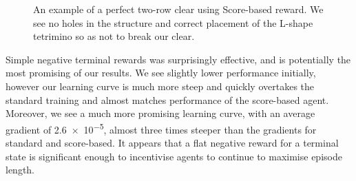 \documentclass[12pt]{article}
\begin{document}
\begin{figure}[H]
    \centering
    
    
    \caption{An example of a perfect two-row clear using Score-based reward. We see no holes in the structure and correct placement of the L-shape tetrimino so as not to break our clear.}
    
    \end{figure}
Simple negative terminal rewards was surprisingly effective, and is potentially the most promising of our results. We see slightly lower performance initially, however our learning curve is much more steep and quickly overtakes the standard training and almost matches performance of the score-based agent. Moreover, we see a much more promising learning curve, with an average gradient of \num{2.6e-5}, almost three times steeper than the gradients for standard and score-based. It appears that a flat negative reward for a terminal state is significant enough to incentivise agents to continue to maximise episode length. 
\begin{table}[H]
    \centering
      \caption{\label{rewardresults} Counts for different types of clears over the course of training for different reward structures.}
\end{table}
\end{document}
